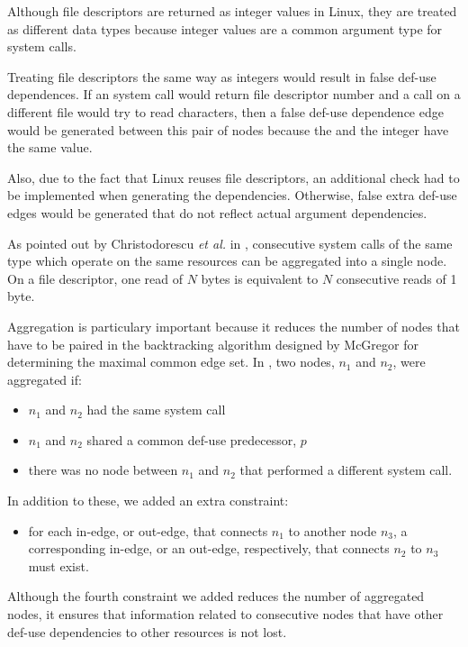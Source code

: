 Although file descriptors are returned as integer values in Linux, they are treated as different data types because integer values are a common argument type for system calls. 

Treating file descriptors the same way as integers would result in false def-use dependences. If an  system call would return file descriptor number  and a  call on a different file would try to read  characters, then a false def-use dependence edge would be generated between this pair of nodes because the  and the integer have the same value.

Also, due to the fact that Linux reuses file descriptors, an additional check had to be implemented when generating the dependencies. Otherwise, false extra def-use edges would be generated that do not reflect actual argument dependencies.

As pointed out by Christodorescu \textit{et al.} in \cite{mining-specifications}, consecutive system calls of the same type which operate on the same resources can be aggregated into a single node. On a file descriptor, one read of $N$ bytes is equivalent to $N$ consecutive reads of 1 byte.

Aggregation is particulary important because it reduces the number of nodes that have to be paired in the backtracking algorithm designed by McGregor for determining the maximal common edge set. In \cite{mining-specifications}, two nodes, $n_1$ and $n_2$, were aggregated if:

\begin{itemize}
	\item $n_1$ and $n_2$ had the same system call
	\item $n_1$ and $n_2$ shared a common def-use predecessor, $p$
	\item there was no node between $n_1$ and $n_2$ that performed a different system call.
\end{itemize}

In addition to these, we added an extra constraint:

\begin{itemize}
	\item for each in-edge, or out-edge, that connects $n_1$ to another node $n_3$, a corresponding in-edge, or an out-edge, respectively, that connects $n_2$ to $n_3$ must exist.
\end{itemize}

Although the fourth constraint we added reduces the number of aggregated nodes, it ensures that information related to consecutive nodes that have other def-use dependencies to other resources is not lost.

